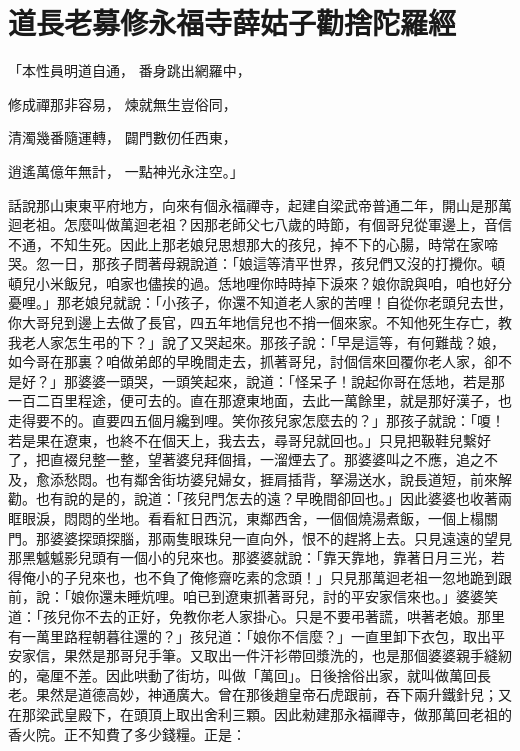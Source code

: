 %

\chapter{道長老募修永福寺\KG 薛姑子勸捨陀羅經}


\begin{showcontents}{}



「本性員明道自通，  番身跳出網羅中，

修成禪那非容易，  煉就無生豈俗同，

清濁幾番隨運轉，  闢門數仞任西東，

逍遙萬億年無計，  一點神光永注空。」

話說那山東東平府地方，向來有個永福禪寺，起建自梁武帝普通二年，開山是那萬迴老祖。怎麼叫做萬迴老祖？因那老師父七八歲的時節，有個哥兒從軍邊上，音信不通，不知生死。因此上那老娘兒思想那大的孩兒，掉不下的心腸，時常在家啼哭。忽一日，那孩子問著母親說道：「娘這等清平世界，孩兒們又沒的打攪你。頓頓兒小米飯兒，咱家也儘挨的過。恁地哩你時時掉下淚來？娘你說與咱，咱也好分憂哩。」那老娘兒就說：「小孩子，你還不知道老人家的苦哩！自從你老頭兒去世，你大哥兒到邊上去做了長官，四五年地信兒也不捎一個來家。不知他死生存亡，教我老人家怎生弔的下？」說了又哭起來。那孩子說：「早是這等，有何難哉？娘，如今哥在那裏？咱做弟郎的早晚間走去，抓著哥兒，討個信來回覆你老人家，卻不是好？」那婆婆一頭哭，一頭笑起來，說道：「怪呆子！說起你哥在恁地，若是那一百二百里程途，便可去的。直在那遼東地面，去此一萬餘里，就是那好漢子，也走得要不的。直要四五個月纔到哩。笑你孩兒家怎麼去的？」那孩子就說：「嗄！若是果在遼東，也終不在個天上，我去去，尋哥兒就回也。」只見把靸鞋兒繫好了，把直裰兒整一整，望著婆兒拜個揖，一溜煙去了。那婆婆叫之不應，追之不及，愈添愁悶。也有鄰舍街坊婆兒婦女，捱肩插背，拏湯送水，說長道短，前來解勸。也有說的是的，說道：「孩兒門怎去的遠？早晚間卻回也。」因此婆婆也收著兩眶眼淚，悶悶的坐地。看看紅日西沉，東鄰西舍，一個個燒湯煮飯，一個上榻關門。那婆婆探頭探腦，那兩隻眼珠兒一直向外，恨不的趕將上去。只見遠遠的望見那黑魆魆影兒頭有一個小的兒來也。那婆婆就說：「靠天靠地，靠著日月三光，若得俺小的子兒來也，也不負了俺修齋吃素的念頭！」只見那萬迴老祖一忽地跪到跟前，說：「娘你還未睡炕哩。咱已到遼東抓著哥兒，討的平安家信來也。」婆婆笑道：「孩兒你不去的正好，免教你老人家掛心。只是不要弔著謊，哄著老娘。那里有一萬里路程朝暮往還的？」孩兒道：「娘你不信麼？」一直里卸下衣包，取出平安家信，果然是那哥兒手筆。又取出一件汗衫帶回漿洗的，也是那個婆婆親手縫紉的，毫厘不差。因此哄動了街坊，叫做「萬回」。日後捨俗出家，就叫做萬回長老。果然是道德高妙，神通廣大。曾在那後趙皇帝石虎跟前，吞下兩升鐵針兒；又在那梁武皇殿下，在頭頂上取出舍利三顆。因此勑建那永福禪寺，做那萬回老祖的香火院。正不知費了多少錢糧。正是：


\end{showcontents}
